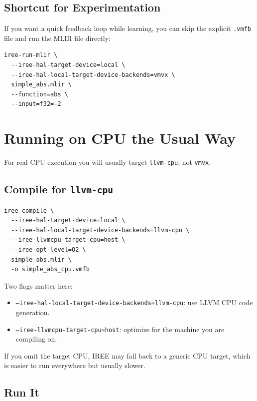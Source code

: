 \documentclass[11pt,a4paper]{article}
\begin{document}
\subsection{Shortcut for Experimentation}

If you want a quick feedback loop while learning, you can skip the explicit \texttt{.vmfb} file and run the MLIR file directly:

\begin{lstlisting}[caption=Compile and run directly from MLIR]
iree-run-mlir \
  --iree-hal-target-device=local \
  --iree-hal-local-target-device-backends=vmvx \
  simple_abs.mlir \
  --function=abs \
  --input=f32=-2
\end{lstlisting}

\section{Running on CPU the Usual Way}

For real CPU execution you will usually target \texttt{llvm-cpu}, not \texttt{vmvx}.

\subsection{Compile for \texttt{llvm-cpu}}

\begin{lstlisting}[caption=Compile for host CPU execution]
iree-compile \
  --iree-hal-target-device=local \
  --iree-hal-local-target-device-backends=llvm-cpu \
  --iree-llvmcpu-target-cpu=host \
  --iree-opt-level=O2 \
  simple_abs.mlir \
  -o simple_abs_cpu.vmfb
\end{lstlisting}

Two flags matter here:
\begin{itemize}
    \item \texttt{--iree-hal-local-target-device-backends=llvm-cpu}: use LLVM CPU code generation.
    \item \texttt{--iree-llvmcpu-target-cpu=host}: optimize for the machine you are compiling on.
\end{itemize}

If you omit the target CPU, IREE may fall back to a generic CPU target, which is easier to run everywhere but usually slower.

\subsection{Run It}
\end{document}
